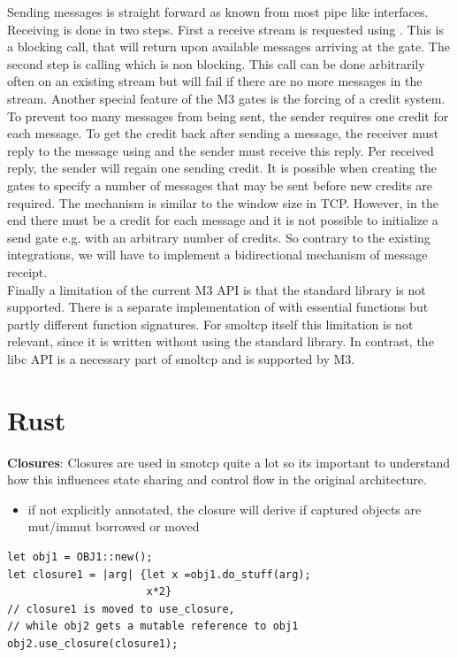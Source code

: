 Sending messages is straight forward as known from most pipe like interfaces. Receiving is done in two steps. First a receive stream is requested using . This is a blocking call, that will return upon available  messages arriving at the gate. The second step is calling  which is non blocking. This call can be done arbitrarily often on an existing stream but will fail if there are no more messages in the stream. Another special feature of the M3 gates is the forcing of a credit system. To prevent too many messages from being sent, the sender requires one credit for each message. To get the credit back after sending a message, the receiver must reply to the message using  and the sender must receive this reply. Per received reply, the sender will regain one sending credit. It is possible when creating the gates to specify a number of messages that may be sent before new credits are required. The mechanism is similar to the window size in TCP. However, in the end there must be a credit for each message and it is not possible to initialize a send gate e.g. with an arbitrary number of credits. So contrary to the existing integrations, we will have to implement a bidirectional mechanism of message receipt.\\

Finally a limitation of the current M3 API is that the standard library is not supported. There is a separate implementation of  with essential functions but partly different function signatures. For smoltcp itself this limitation is not relevant, since it is written without using the standard library. In contrast, the libc API is a necessary part of smoltcp and is supported by M3. 



\section{Rust}
\textbf{Closures}: Closures are used in smotcp quite a lot so its important to understand how this influences state sharing and control flow in the original architecture.
\begin{itemize}
    \item if not explicitly annotated, the closure will derive if captured objects are mut/immut borrowed or moved 
\end{itemize}
\begin{verbatim}
let obj1 = OBJ1::new();
let closure1 = |arg| {let x =obj1.do_stuff(arg);
                      x*2}
// closure1 is moved to use_closure, 
// while obj2 gets a mutable reference to obj1
obj2.use_closure(closure1);
\end{verbatim}

